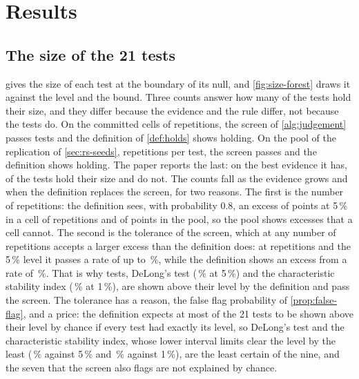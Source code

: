 \section{Results}
\label{sec:results}

\subsection{The size of the 21 tests}
\label{sec:rs-size}

 gives the size of each test at the boundary of its null, and \cref{fig:size-forest} draws it against the level and the bound.
Three counts answer how many of the \nTests{} tests hold their size, and they differ because the evidence and the rule differ, not because the tests do.
On the committed cells of \nNullReps{} repetitions, the screen of \cref{alg:judgement} passes \nHoldCellRule{} tests and the definition of \cref{def:holds} shows \nHoldCellDef{} holding.
On the pool of the replication of \cref{sec:rs-seeds}, \nRepsPooled{} repetitions per test, the screen passes \nHoldPoolRule{} and the definition shows \nHold{} holding.
The paper reports the last: on the best evidence it has, \nHold{} of the \nTests{} tests hold their size and \nNotHold{} do not.
The counts fall as the evidence grows and when the definition replaces the screen, for two reasons.
The first is the number of repetitions: the definition sees, with probability 0.8, an excess of \detIntFiveFour{} points at 5\,\% in a cell of \nNullReps{} repetitions and of \detIntFiveTwoHundredK{} points in the pool, so the pool shows excesses that a cell cannot.
The second is the tolerance of the screen, which at any number of repetitions accepts a larger excess than the definition does: at \nRepsPooled{} repetitions and the 5\,\% level it passes a rate of up to \boundFivePool\,\%, while the definition shows an excess from a rate of \intRateFiveTwoHundredK\,\%.
That is why \nPoolDefOnly{} tests, DeLong's test (\pooledDel\,\% at 5\,\%) and the characteristic stability index (\pooledCsiOne\,\% at 1\,\%), are shown above their level by the definition and pass the screen.
The tolerance has a reason, the false flag probability of \cref{prop:false-flag}, and a price: the definition expects at most \expFalseAbove{} of the 21 tests to be shown above their level by chance if every test had exactly its level, so DeLong's test and the characteristic stability index, whose lower interval limits clear the level by the least (\pooledDelLo\,\% against 5\,\% and \pooledCsiLoOne\,\% against 1\,\%), are the least certain of the nine, and the seven that the screen also flags are not explained by chance.
